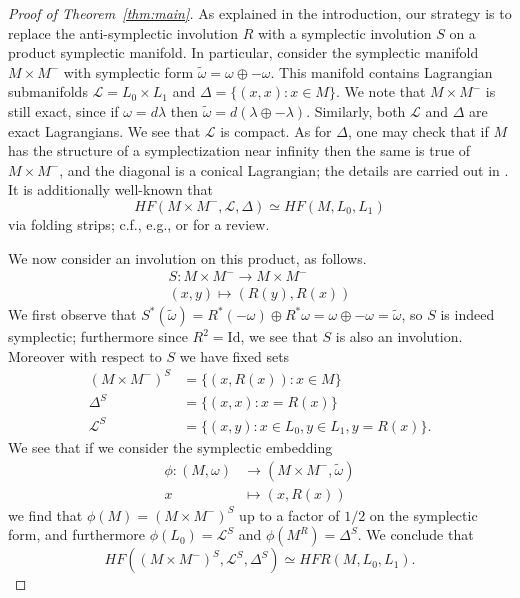 \documentclass[11pt,reqno]{amsart}
\theoremstyle{definition}
\theoremstyle{remark}
\renewcommand{\tilde}{\widetilde}
\newcommand{\cL}{\mathcal{L}}
\newcommand{\HF}{\mathit{HF}}
\numberwithin{equation}{section}
\newcommand\co{\colon}
\begin{document}
\begin{proof}[Proof of Theorem~\ref{thm:main}] As explained in the introduction, our strategy is to replace the anti-symplectic involution $R$ with a symplectic involution $S$ on a product symplectic manifold. In particular, consider the symplectic manifold $M \times M^-$ with symplectic form $\tilde{\omega}= \omega \oplus -\omega$. This manifold contains Lagrangian submanifolds $\cL = L_0 \times L_1$ and $\Delta = \{(x,x) : x \in M\}$. We note that $M \times M^-$ is still exact, since if $\omega = d\lambda$ then $\tilde{\omega}= d\left(\lambda \oplus -\lambda\right)$. Similarly, both $\cL$ and $\Delta$ are exact Lagrangians. We see that $\cL$ is compact. As for $\Delta$, one may check that if $M$ has the structure of a symplectization near infinity then the same is true of $M\times M^-$, and the diagonal is a conical Lagrangian; the details are carried out in \cite[Section 2.2]{Hendricks:symplecto}. It is additionally well-known that 
%
\[ \HF(M \times M^-, \cL, \Delta) \simeq HF(M, L_0, L_1)\]
%
via folding strips; c.f., e.g., \cite[Proposition 8.2]{Ganatra} or \cite[Lemma 2.9]{Hendricks:symplecto} for a review.

We now consider an involution on this product, as follows.
%
\begin{align*} 
S: M\times M^{-} \rightarrow M \times M^{-} \\
		(x,y) \mapsto (R(y), R(x) ) 
\end{align*}
%
We first observe that $S^*(\tilde{\omega}) = R^*(-\omega)\oplus R^*\omega = \omega \oplus -\omega = \tilde{\omega}$, so $S$ is indeed symplectic; furthermore since $R^2 = \mathrm{Id}$, we see that $S$ is also an involution. Moreover with respect to $S$ we have fixed sets
%
\begin{align*}
(M\times M^-)^{S} &= \{(x,R(x)): x \in M\} \\
\Delta^{S} &= \{(x,x): x = R(x) \} \\
\cL^{S} &= \{(x,y): x \in L_0, y \in L_1, y = R(x)\}.
\end{align*}
%
We see that if we consider the symplectic embedding
%
\begin{align*}
\phi \co (M, \omega) &\rightarrow (M \times M^{-}, \tilde{\omega}) \\
		x &\mapsto (x, R(x))
\end{align*}
%
we find that $\phi(M) = (M\times M^-)^{S}$ up to a factor of $1/2$ on the symplectic form, and furthermore $\phi(L_0) = \cL^{S}$ and $\phi(M^R) = \Delta^{S}$. We conclude that
%
\[ HF((M\times M^-)^{S}, \cL^{S}, \Delta^{S}) \simeq HFR(M, L_0, L_1).\]


\end{proof}
\end{document}
